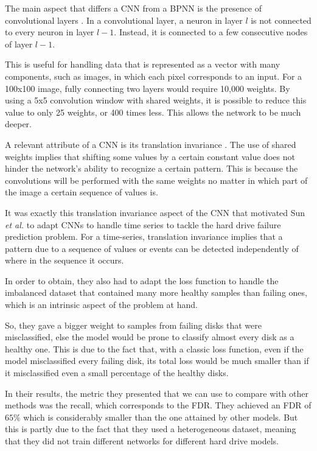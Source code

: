 The main aspect that differs a CNN from a BPNN is the presence of convolutional layers \cite{o2015introduction}.
In a convolutional layer, a neuron in layer $l$ is not connected to every neuron in layer $l-1$.
Instead, it is connected to a few consecutive nodes of layer $l-1$.

This is useful for handling data that is represented as a vector with many components, such as images, in which each pixel corresponds to an input.
For a 100x100 image, fully connecting two layers would require 10,000 weights.
By using a 5x5 convolution window with shared weights, it is possible to reduce this value to only 25 weights, or 400 times less.
This allows the network to be much deeper.
 
A relevant attribute of a CNN is its translation invariance \cite{kayhan2020translation}.
The use of shared weights implies that shifting some values by a certain constant value does not hinder the network's ability to recognize a certain pattern.
This is because the convolutions will be performed with the same weights no matter in which part of the image a certain sequence of values is.

It was exactly this translation invariance aspect of the CNN that motivated Sun \textit{et al.} \cite{sun2019system} to adapt CNNs to handle time series to tackle the hard drive failure prediction problem.
For a time-series, translation invariance implies that a pattern due to a sequence of values or events can be detected independently of where in the sequence it occurs.

In order to obtain, they also had to adapt the loss function to handle the imbalanced dataset that contained many more healthy samples than failing ones, which is an intrinsic aspect of the problem at hand.

So, they gave a bigger weight to samples from failing disks that were misclassified, else the model would be prone to classify almost every disk as a healthy one.
This is due to the fact that, with a classic loss function, even if the model misclassified every failing disk, its total loss would be much smaller than if it misclassified even a small percentage of the healthy disks.

In their results, the metric they presented that we can use to compare with other methods was the recall, which corresponds to the FDR.
They achieved an FDR of $65\%$ which is considerably smaller than the one attained by other models.
But this is partly due to the fact that they used a heterogeneous dataset, meaning that they did not train different networks for different hard drive models.